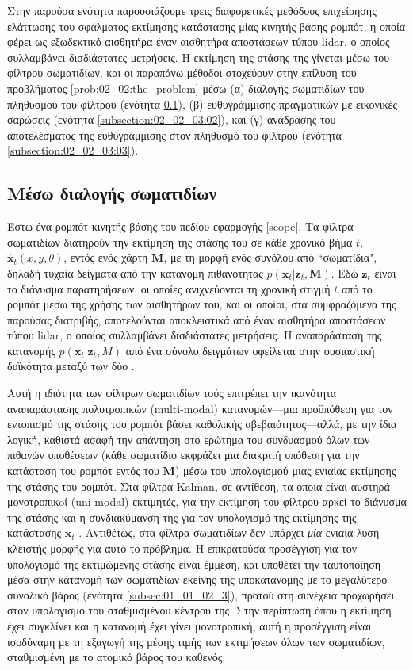 Στην παρούσα ενότητα παρουσιάζουμε τρεις διαφορετικές μεθόδους επιχείρησης
ελάττωσης του σφάλματος εκτίμησης κατάστασης μίας κινητής βάσης ρομπότ, η οποία
φέρει ως εξωδεκτικό αισθητήρα έναν αισθητήρα αποστάσεων τύπου lidar, ο οποίος
συλλαμβάνει δισδιάστατες μετρήσεις.  Η εκτίμηση της στάσης της γίνεται μέσω
του φίλτρου σωματιδίων, και οι παραπάνω μέθοδοι στοχεύουν στην επίλυση του
προβλήματος \ref{prob:02_02:the_problem} μέσω (α) διαλογής σωματιδίων του
πληθυσμού του φίλτρου (ενότητα \ref{subsection:02_02_03:01}), (β) ευθυγράμμισης
πραγματικών με εικονικές σαρώσεις (ενότητα \ref{subsection:02_02_03:02}),
και (γ) ανάδρασης του αποτελέσματος της ευθυγράμμισης στον πληθυσμό του φίλτρου
(ενότητα \ref{subsection:02_02_03:03}).

\subsection{Μέσω διαλογής σωματιδίων}
\label{subsection:02_02_03:01}

Έστω ένα ρομπότ κινητής βάσης του πεδίου εφαρμογής \ref{scope}. Τα φίλτρα
σωματιδίων διατηρούν την εκτίμηση της στάσης του σε κάθε χρονικό βήμα $t$,
$\hat{\bm{x}}_t (x, y, \theta)$, εντός ενός χάρτη $\bm{M}$, με τη μορφή ενός
συνόλου από ``σωματίδια", δηλαδή τυχαία δείγματα από την κατανομή πιθανότητας
$p(\bm{x}_t | \bm{z}_t, \bm{M})$. Εδώ $\bm{z}_t$ είναι το διάνυσμα
παρατηρήσεων, οι οποίες ανιχνεύονται τη χρονική στιγμή $t$ από το ρομπότ μέσω
της χρήσης των αισθητήρων του, και οι οποίοι, στα συμφραζόμενα της παρούσας
διατριβής, αποτελούνται αποκλειστικά από έναν αισθητήρα αποστάσεων τύπου lidar,
ο οποίος συλλαμβάνει δισδιάστατες μετρήσεις. H αναπαράσταση της κατανομής
$p(\bm{x}_t | \bm{z}_t, M)$ από ένα σύνολο δειγμάτων οφείλεται στην ουσιαστική
δυϊκότητα μεταξύ των δύο \cite{Smith1992}.

Αυτή η ιδιότητα των φίλτρων σωματιδίων τούς επιτρέπει την ικανότητα
αναπαράστασης πολυτροπικών (multi-modal) κατανομών---μια προϋπόθεση για τον
εντοπισμό της στάσης του ρομπότ βάσει καθολικής αβεβαιότητος---αλλά, με την
ίδια λογική, καθιστά ασαφή την απάντηση στο ερώτημα του συνδυασμού όλων των
πιθανών υποθέσεων (κάθε σωματίδιο εκφράζει μια διακριτή υπόθεση για την
κατάσταση του ρομπότ εντός του $\bm{M}$) μέσω του υπολογισμού μιας ενιαίας
εκτίμησης της στάσης του ρομπότ. Στα φίλτρα Kalman, σε αντίθεση, τα οποία είναι
αυστηρά μονοτροπικoί (uni-modal) εκτιμητές, για την εκτίμηση του φίλτρου αρκεί
το διάνυσμα της στάσης και η συνδιακύμανση της για τον υπολογισμό της εκτίμησης
της κατάστασης $\bm{x}_t$ \cite{Maybeck1979}. Αντιθέτως, στα φίλτρα σωματιδίων
δεν υπάρχει \textit{μία} ενιαία λύση κλειστής μορφής για αυτό το πρόβλημα. Η
επικρατούσα προσέγγιση για τον υπολογισμό της εκτιμώμενης στάσης είναι έμμεση,
και υποθέτει την ταυτοποίηση μέσα στην κατανομή των σωματιδίων εκείνης της
υποκατανομής με το μεγαλύτερο συνολικό βάρος (ενότητα \ref{subsec:01_01_02_3}),
προτού στη συνέχεια προχωρήσει στον υπολογισμό του σταθμισμένου κέντρου της.
Στην περίπτωση όπου η εκτίμηση έχει συγκλίνει και η κατανομή έχει γίνει
μονοτροπική, αυτή η προσέγγιση είναι ισοδύναμη με τη εξαγωγή της μέσης τιμής
των εκτιμήσεων όλων των σωματιδίων, σταθμισμένη με το ατομικό βάρος του
καθενός.

